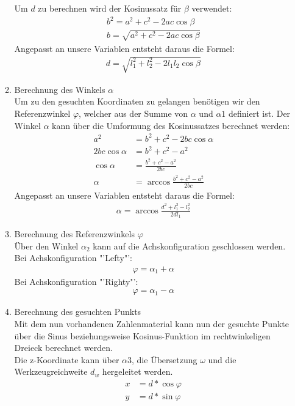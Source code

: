 \begin{itemize}
\begin{enumerate}
Um $d$ zu berechnen wird der Kosinussatz für $\beta$ verwendet:
\begin{align*}
b^2 = a^2+c^2-2ac\cos\beta \\
b = \sqrt{a^2+c^2-2ac\cos\beta}
\end{align*}
Angepasst an unsere Variablen entsteht daraus die Formel:
\begin{align*}
d = \sqrt{l_1^2+l_2^2-2l_1l_2\cos\beta}
\end{align*}
\item Berechnung des Winkels $\alpha$\\
Um zu den gesuchten Koordinaten zu gelangen benötigen wir den Referenzwinkel $\varphi$, welcher aus der Summe von $\alpha$ und $\alpha1$ definiert ist. Der Winkel $\alpha$ kann über die Umformung des Kosinussatzes berechnet werden:
\begin{align*}
a^2 & = b^2 + c^2 - 2bc \cos \alpha \\
2bc \cos \alpha & = b^2 + c^2 - a^2 \\
\cos \alpha & = \frac{b^2 + c^2 - a^2}{2bc} \\
\alpha & = \arccos \frac{b^2 + c^2 - a^2}{2bc}
\end{align*}
Angepasst an unsere Variablen entsteht daraus die Formel:
\begin{align*}
\alpha = \arccos \frac{d^2 + l_1^2 - l_2^2}{2dl_1}
\end{align*}
\newpage
\item Berechnung des Referenzwinkels $\varphi$\\
Über den Winkel $\alpha_2$ kann auf die Achskonfiguration geschlossen werden.
Bei Achskonfiguration "'Lefty"':
\begin{align*}
\varphi = \alpha_1 + \alpha
\end{align*}
Bei Achskonfiguration "'Righty"':
\begin{align*}
\varphi = \alpha_1 - \alpha
\end{align*}
\item Berechnung des gesuchten Punkts\\
Mit dem nun vorhandenen Zahlenmaterial kann nun der gesuchte Punkte über die Sinus beziehungsweise Kosinus-Funktion im rechtwinkeligen Dreieck berechnet werden.\\
Die z-Koordinate kann über $\alpha3$, die Übersetzung $\omega$ und die Werkzeugreichweite $d_w$ hergeleitet werden.
\begin{align*}
x &= d * \cos \varphi \\
y &= d * \sin \varphi \\

\end{align*}
\end{enumerate}
\end{itemize}
